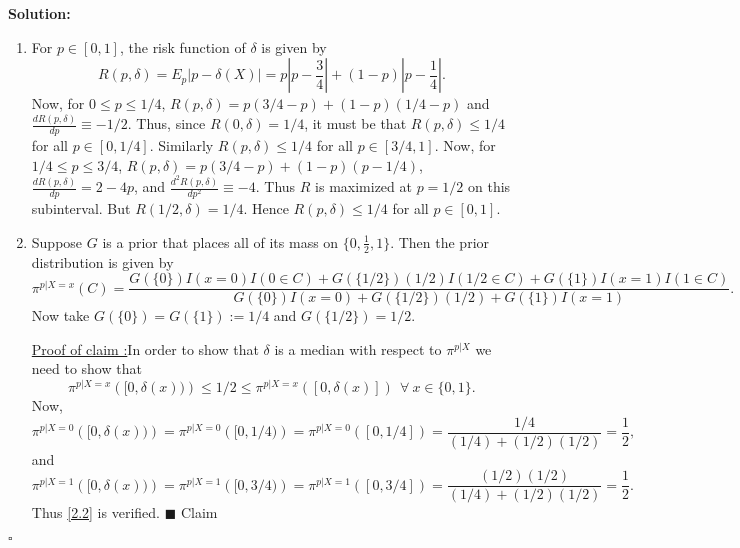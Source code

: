 \documentclass[12pt]{article}
\newcounter{ProofCounter}
\newcounter{ClaimCounter}[ProofCounter]
\newenvironment{Solution}{\stepcounter{ProofCounter}\textbf{Solution:}}{\hfill$\square$}
\newenvironment{claim}[1]{\vspace{1mm}\stepcounter{ClaimCounter}\par\noindent\underline{\bf Claim \theClaimCounter:}\space#1}{}
\newenvironment{claimproof}[1]{\par\noindent\underline{Proof of claim \theClaimCounter:}\space#1}{\hfill $\blacksquare$ Claim \theClaimCounter}
\begin{document}
\begin{Solution}
  \begin{enumerate}[label=(\alph*), leftmargin=*]
    \item For $p \in [0,1]$, the risk function of $\delta$ is given by
      \begin{equation}
        R(p, \delta) = E_p|p - \delta(X)| = p\left|p - \frac{3}{4}\right| + (1-p)\left|p - \frac{1}{4}\right|.
        \label{2.1}
      \end{equation}
      Now, for $0 \leq p \leq 1/4$, $R(p, \delta) = p(3/4 - p) + (1-p)(1/4 - p)$ and $\frac{dR(p,\delta)}{dp} \equiv -1/2$. Thus, since $R(0,\delta) =
      1/4$, it must be that $R(p, \delta) \leq 1/4$ for all $p \in [0,1/4]$. Similarly $R(p, \delta) \leq 1/4$ for all $p \in [3/4, 1]$. Now, for
      $1/4 \leq p \leq 3/4$, $R(p, \delta) = p(3/4 - p) + (1-p)(p - 1/4)$, $\frac{dR(p,\delta)}{dp} = 2 - 4p$, and $\frac{d^2R(p,\delta)}{dp^2} \equiv
      -4$. Thus $R$ is maximized at $p = 1/2$ on this subinterval. But $R(1/2, \delta) = 1/4$. Hence $R(p, \delta) \leq 1/4$ for all $p \in [0,1]$.

    \item Suppose $G$ is a prior that places all of its mass on $\{0, \frac{1}{2}, 1\}$. Then the prior distribution is given by
      \[
        \pi^{p|X=x}(C) = \frac{ G(\{0\})I(x = 0)I(0 \in C) + G(\{1/2\})(1/2)I(1/2 \in C) + G(\{1\})I(x=1)I(1\in C) }{  G(\{0\})I(x = 0) +
        G(\{1/2\})(1/2) + G(\{1\})I(x=1) }.
      \]
      Now take $G(\{0\}) = G(\{1\}) := 1/4$ and $G(\{1/2\}) = 1/2$.

      \begin{claimproof}
        In order to show that $\delta$ is a median with respect to $\pi^{p|X}$ we need to show that 
        \begin{equation}
          \pi^{p|X=x}\left( [0,\delta(x)) \right) \leq 1/2 \leq \pi^{p|X=x}\left( [0, \delta(x)] \right) \ \ \forall \ x \in \{0,1\}.
          \label{2.2}
        \end{equation}
        Now, 
        \[
          \pi^{p|X=0}\left( [0,\delta(x)) \right) = \pi^{p|X=0}\left( [0,1/4) \right) = \pi^{p|X=0}\left( [0,1/4] \right) = \frac{1/4}{(1/4) +
          (1/2)(1/2)} = \frac{1}{2},
        \]
        and
        \[
          \pi^{p|X=1}\left( [0,\delta(x)) \right) = \pi^{p|X=1}\left( [0,3/4) \right) = \pi^{p|X=1}\left( [0,3/4] \right) = \frac{(1/2)(1/2)}{(1/4) +
          (1/2)(1/2)} = \frac{1}{2}.
        \]
        Thus \eqref{2.2} is verified.
      \end{claimproof}


\end{enumerate}
\end{Solution}
\end{document}
